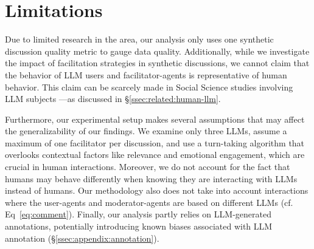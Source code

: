 %
\section{Limitations} 
\label{sec:limitations}

Due to limited research in the area, our analysis only uses one synthetic discussion quality metric to gauge data quality. Additionally, while we investigate the impact of facilitation strategies in synthetic discussions, we cannot claim that the behavior of \ac{LLM} users and facilitator-agents is representative of human behavior. This claim can be scarcely made in Social Science studies involving \ac{LLM} subjects \cite{rossi_2024, zhou-etal-2024-real}—as discussed in \S\ref{ssec:related:human-llm}.

Furthermore, our experimental setup makes several assumptions that may affect the generalizability of our findings. We examine only three \acp{LLM}, assume a maximum of one facilitator per discussion, and use a turn-taking algorithm that overlooks contextual factors like relevance and emotional engagement, which are crucial in human interactions. Moreover, we do not account for the fact that humans may behave differently when knowing they are interacting with \acp{LLM} instead of humans. Our methodology also does not take into account interactions where the user-agents and moderator-agents are based on different \acp{LLM} (cf. Eq~\ref{eq:comment}). Finally, our analysis partly relies on \ac{LLM}-generated annotations, potentially introducing known biases associated with \ac{LLM} annotation (\S\ref{ssec:appendix:annotation}).
